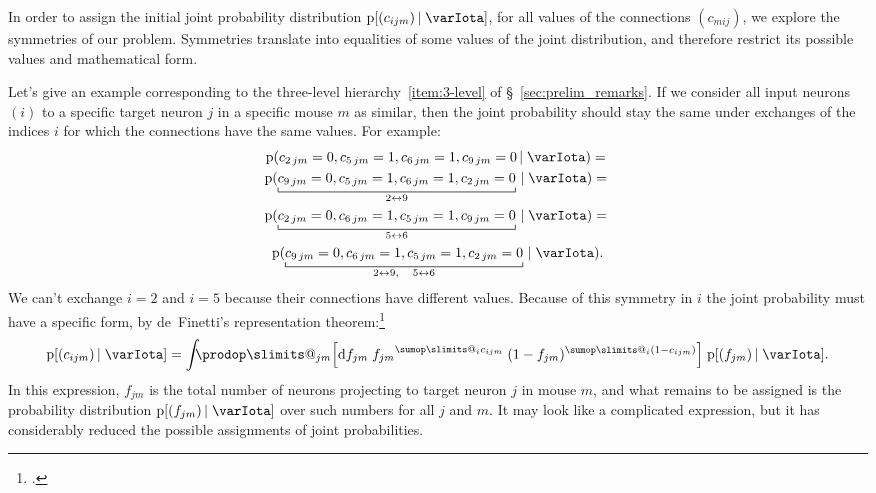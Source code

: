 \documentclass[\ifafour a4paper,12pt,\else a5paper,10pt,\fi%
onecolumn,oneside,article,%
british%
]{memoir}
\makeatletter
\theoremstyle{remark}
\theoremstyle{innote}
\def\sum{\DOTSI\sumop\slimits@}
\def\prod{\DOTSI\prodop\slimits@}
\newcommand*{\citep}{\footcites}
\newcommand*{\di}{\mathrm{d}}%
\newcommand*{\pf}{\mathrm{p}}%
\renewcommand*{\|}[1][]{\nonscript\,#1\vert\nonscript\;\mathopen{}}
\newcommand*{\sect}{\S}%
\newcommand*{\yI}{\varIota}
\newcommand*{\yc}{c}
\makeatother
\begin{document}
\bigskip


In order to assign the initial joint probability distribution
$\pf[(\yc_{ijm}) \| \yI]$, for all values of the connections $(\yc_{mij})$,
we explore the symmetries of our problem. Symmetries translate into
equalities of some values of the joint distribution, and therefore restrict
its possible values and mathematical form.

Let's give an example corresponding to the three-level
hierarchy~\ref{item:3-level} of \sect~\ref{sec:prelim_remarks}. If we
consider all input neurons $(i)$ to a specific target neuron $j$ in a
specific mouse $m$ as similar, then the joint probability should stay the
same under exchanges of the indices $i$ for which the connections have the
same values. For example:
\begin{multline}
  \label{eq:example_exchange_i}
  \pf(\yc_{2\,jm}=0, \yc_{5\,jm}=1, \yc_{6\,jm}=1, \yc_{9\,jm}=0 \| \yI) ={}\\
  \pf(\underbracket[0.5pt]{\yc_{9\,jm}=0, \yc_{5\,jm}=1, \yc_{6\,jm}=1, \yc_{2\,jm}=0}_{2\leftrightarrow 9} \| \yI) ={}\\
  \pf(\underbracket[0.5pt]{\yc_{2\,jm}=0, \yc_{6\,jm}=1, \yc_{5\,jm}=1, \yc_{9\,jm}=0}_{5\leftrightarrow 6} \| \yI) ={}\\
  \pf(\underbracket[0.5pt]{\yc_{9\,jm}=0, \yc_{6\,jm}=1, \yc_{5\,jm}=1, \yc_{2\,jm}=0}_{2\leftrightarrow 9,\quad 5\leftrightarrow 6} \| \yI).
\end{multline}
We can't exchange $i=2$ and $i=5$ because their connections have different
values. Because of this symmetry in $i$ the joint probability must have a
specific form, by de~Finetti's representation
theorem:\citep{definetti1930,hewittetal1955,heathetal1976,diaconis1977,diaconisetal1980,dawid2013}
\begin{equation}
  \label{eq:definetti_example_i}
  \pf[(\yc_{ijm}) \| \yI] =
  \int\!\!\!\prod_{jm}\Bigl[\di f_{jm}\;
  {f_{jm}}^{\sum_{i}\yc_{ijm}}\;(1-f_{jm})^{\sum_{i}(1-\yc_{ijm})}\Bigr]\;
  \pf[(f_{jm}) \| \yI].
\end{equation}
In this expression, $f_{jm}$ is the total number of neurons projecting to
target neuron $j$ in mouse $m$, and what remains to be assigned is the
probability distribution $\pf[(f_{jm}) \| \yI]$ over such numbers for all
$j$ and $m$. It may look like a complicated expression, but it has
considerably reduced the possible assignments of joint probabilities.
\end{document}
